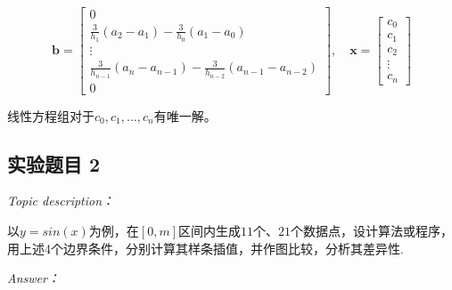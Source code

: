 \documentclass[12pt]{ctexart}
\begin{document}
	\[
	\mathbf{b}=\begin{bmatrix}
	0 \\
	\frac{3}{h_1}(a_2-a_1)-\frac{3}{h_0}(a_1-a_0) \\
	\vdots \\
	\frac{3}{h_{n-1}}(a_n-a_{n-1})-\frac{3}{h_{n-2}}(a_{n-1}-a_{n-2}) \\
	0
	\end{bmatrix},\quad
	\mathbf{x}=\begin{bmatrix}
	c_0 \\
	c_1 \\
	c_2 \\
	\vdots \\
	c_n
	\end{bmatrix}
	\]
	
	线性方程组对于$c_0,c_1,\dots,c_n$有唯一解。
	
	\subsection{实验题目 2}
	\textit{Topic description：}
	
	以$y=sin(x)$为例，在$[0,m]$区间内生成$11$个、$21$个数据点，设计算法或程序，用上述4个边界条件，分别计算其样条插值，并作图比较，分析其差异性.
	
	\textit{Answer：}
	
\end{document}
